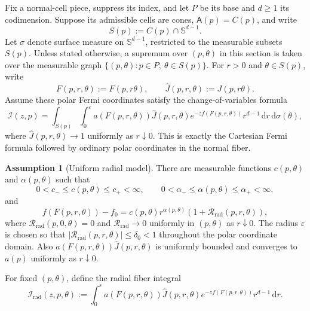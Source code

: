 \documentclass[11pt]{amsart}
\numberwithin{equation}{section}
\theoremstyle{definition}
\newtheorem{assumption}[theorem]{Assumption}
\theoremstyle{remark}
\newcommand{\dd}{\,\mathrm{d}}
\newcommand{\eps}{\varepsilon}
\newcommand{\cI}{\mathcal{I}}
\newcommand{\Afib}{\mathsf{A}}
\begin{document}
Fix a normal-cell piece, suppress its index, and let $P$ be its base and
$d\ge1$ its codimension.  Suppose its
admissible cells are cones, $\Afib(p)=C(p)$, and write
\begin{equation*}
  S(p):=C(p)\cap\mathbb S^{d-1}.
\end{equation*}
Let $\sigma$ denote surface measure on $\mathbb S^{d-1}$, restricted to the
measurable subsets $S(p)$.  Unless stated otherwise, a supremum over
$(p,\theta)$ in this section is taken over the measurable graph
$\{(p,\theta):p\in P,\ \theta\in S(p)\}$.  For $r>0$ and
$\theta\in S(p)$, write
\[
 F(p,r,\theta):=F(p,r\theta),
 \qquad
 \widehat J(p,r,\theta):=J(p,r\theta).
\]
Assume these polar Fermi coordinates satisfy the change-of-variables formula
\begin{equation}\label{eq:polar-cov}
 \cI(z,p)=\int_{S(p)}\int_0^\eps
 a(F(p,r,\theta))\widehat J(p,r,\theta)
 e^{-zf(F(p,r,\theta))}r^{d-1}\dd r\dd\sigma(\theta),
\end{equation}
where $\widehat J(p,r,\theta)\to1$ uniformly as $r\downarrow0$.
This is exactly the Cartesian Fermi formula followed by ordinary polar
coordinates in the normal fiber.

\begin{assumption}[Uniform radial model]\label{ass:radial}
There are measurable functions
$c(p,\theta)$ and $\alpha(p,\theta)$ such that
\begin{equation}\label{eq:radial-bounds}
 0<c_-\le c(p,\theta)\le c_+<\infty,
 \qquad
 0<\alpha_-\le\alpha(p,\theta)\le\alpha_+<\infty,
\end{equation}
and
\begin{equation}\label{eq:radial-phase}
 f(F(p,r,\theta))-f_0
 =c(p,\theta)r^{\alpha(p,\theta)}(1+\mathcal R_{\mathrm{rad}}(p,r,\theta)),
\end{equation}
where $\mathcal R_{\mathrm{rad}}(p,0,\theta)=0$ and $\mathcal R_{\mathrm{rad}}\to0$ uniformly in $(p,\theta)$ as
$r\downarrow0$.  The radius $\eps$ is chosen so that
$|\mathcal R_{\mathrm{rad}}(p,r,\theta)|\le\delta_0<1$ throughout the polar coordinate domain.
Also $a(F(p,r,\theta))\widehat J(p,r,\theta)$ is uniformly bounded and
converges to $a(p)$ uniformly as $r\downarrow0$.
\end{assumption}

For fixed $(p,\theta)$, define the radial fiber integral
\begin{equation}\label{eq:radial-fiber}
 \cI_{\mathrm{rad}}(z,p,\theta):=\int_0^\eps
 a(F(p,r,\theta))\widehat J(p,r,\theta)
 e^{-zf(F(p,r,\theta))}r^{d-1}\dd r.
\end{equation}
\end{document}
